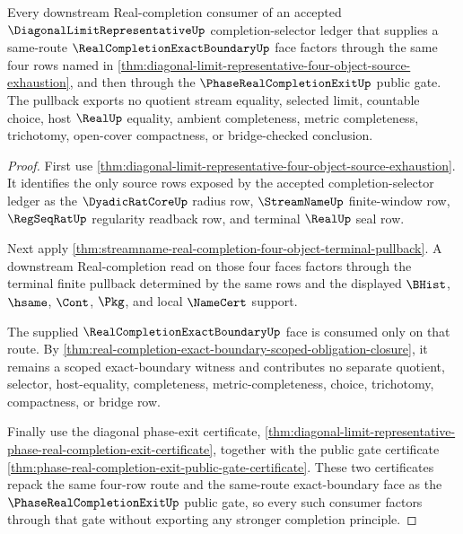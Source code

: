 \begin{theorem}
\label{thm:diagonal-limit-representative-exact-boundary-consumer-pullback}
Every downstream Real-completion consumer of an accepted $\DiagonalLimitRepresentativeUp$ completion-selector ledger that supplies a same-route $\RealCompletionExactBoundaryUp$ face factors through the same four rows named in \autoref{thm:diagonal-limit-representative-four-object-source-exhaustion}, and then through the $\PhaseRealCompletionExitUp$ public gate. The pullback exports no quotient stream equality, selected limit, countable choice, host $\RealUp$ equality, ambient completeness, metric completeness, trichotomy, open-cover compactness, or bridge-checked conclusion.
\end{theorem}
\begin{proof}
First use \autoref{thm:diagonal-limit-representative-four-object-source-exhaustion}. It identifies the only source rows exposed by the accepted completion-selector ledger as the $\DyadicRatCoreUp$ radius row, $\StreamNameUp$ finite-window row, $\RegSeqRatUp$ regularity readback row, and terminal $\RealUp$ seal row.

Next apply \autoref{thm:streamname-real-completion-four-object-terminal-pullback}. A downstream Real-completion read on those four faces factors through the terminal finite pullback determined by the same rows and the displayed $\BHist$, $\hsame$, $\Cont$, $\Pkg$, and local $\NameCert$ support.

The supplied $\RealCompletionExactBoundaryUp$ face is consumed only on that route. By \autoref{thm:real-completion-exact-boundary-scoped-obligation-closure}, it remains a scoped exact-boundary witness and contributes no separate quotient, selector, host-equality, completeness, metric-completeness, choice, trichotomy, compactness, or bridge row.

Finally use the diagonal phase-exit certificate, \autoref{thm:diagonal-limit-representative-phase-real-completion-exit-certificate}, together with the public gate certificate \autoref{thm:phase-real-completion-exit-public-gate-certificate}. These two certificates repack the same four-row route and the same-route exact-boundary face as the $\PhaseRealCompletionExitUp$ public gate, so every such consumer factors through that gate without exporting any stronger completion principle.
\end{proof}
